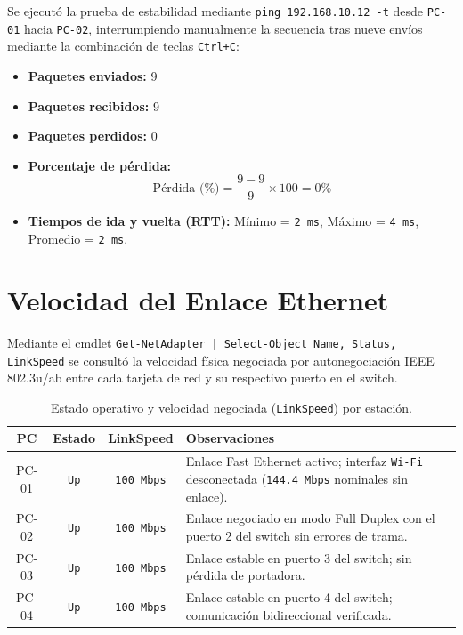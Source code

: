 \documentclass[11pt, a4paper]{article}
\begin{document}
Se ejecutó la prueba de estabilidad mediante \texttt{ping 192.168.10.12 -t} desde \texttt{PC-01} hacia \texttt{PC-02}, interrumpiendo manualmente la secuencia tras nueve envíos mediante la combinación de teclas \texttt{Ctrl+C}:

\begin{itemize}
    \item \textbf{Paquetes enviados:} 9
    \item \textbf{Paquetes recibidos:} 9
    \item \textbf{Paquetes perdidos:} 0
    \item \textbf{Porcentaje de pérdida:}
    \[
        \text{Pérdida (\%)} = \frac{9 - 9}{9} \times 100 = 0\%
    \]
    \item \textbf{Tiempos de ida y vuelta (RTT):} Mínimo = \texttt{2 ms}, Máximo = \texttt{4 ms}, Promedio = \texttt{2 ms}.
\end{itemize}

\section{Velocidad del Enlace Ethernet}

Mediante el cmdlet \texttt{Get-NetAdapter | Select-Object Name, Status, LinkSpeed} se consultó la velocidad física negociada por autonegociación IEEE 802.3u/ab entre cada tarjeta de red y su respectivo puerto en el switch.

\begin{table}[h!]
\centering
\small
\setlength{\tabcolsep}{5pt}
\caption{Estado operativo y velocidad negociada (\texttt{LinkSpeed}) por estación.}
\begin{tabularx}{\textwidth}{ccc>{\raggedright\arraybackslash}X}
\toprule
\textbf{PC} & \textbf{Estado} & \textbf{LinkSpeed} & \textbf{Observaciones} \\
\midrule
PC-01 & \texttt{Up} & \texttt{100 Mbps} & Enlace Fast Ethernet activo; interfaz \texttt{Wi-Fi} desconectada (\texttt{144.4 Mbps} nominales sin enlace). \\
PC-02 & \texttt{Up} & \texttt{100 Mbps} & Enlace negociado en modo Full Duplex con el puerto 2 del switch sin errores de trama. \\
PC-03 & \texttt{Up} & \texttt{100 Mbps} & Enlace estable en puerto 3 del switch; sin pérdida de portadora. \\
PC-04 & \texttt{Up} & \texttt{100 Mbps} & Enlace estable en puerto 4 del switch; comunicación bidireccional verificada. \\
\bottomrule
\end{tabularx}
\end{table}
\end{document}
